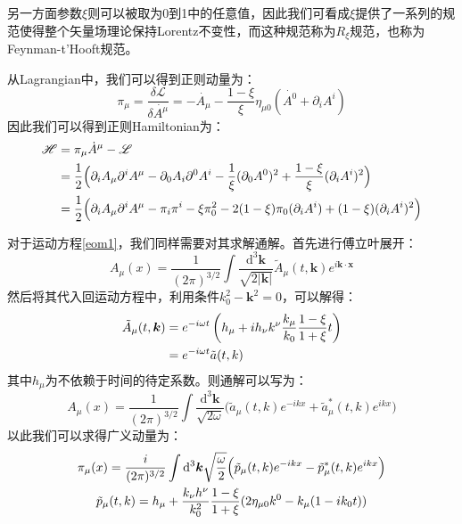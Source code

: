 另一方面参数$\xi$则可以被取为0到1中的任意值，因此我们可看成$\xi$提供了一系列的规范使得整个矢量场理论保持Lorentz不变性，而这种规范称为$R_\xi$规范，也称为Feynman-t'Hooft规范。

从Lagrangian中，我们可以得到正则动量为：
\begin{equation}
\pi_\mu=\frac{\delta\mathcal{L}}{\delta\dot{A^\mu}}=-\dot{A_\mu}-\frac{1-\xi}{\xi}\eta_{\mu 0}(\dot{A^0}+\partial_i A^i)
\end{equation}
因此我们可以得到正则Hamiltonian为：
\begin{align}
\mathscr{H}&=\pi_\mu \dot{A}^\mu-\mathscr{L}\notag\\
&=\frac{1}{2}\Big( \partial_iA_\mu\partial^iA^\mu-\partial_0{A_i}\partial^0{A^i}-\frac{1}{\xi}(\partial_0{A^0})^2+\frac{1-\xi}{\xi}(\partial_iA^i)^2\Big)\notag\\
&=\frac{1}{2}\Big(	\partial_iA_\mu\partial^iA^\mu-\pi_i\pi^i-{\xi}\pi_0^2-2(1-\xi)\pi_0(\partial_iA^i)+(1-{\xi})(\partial_i A^i)^2\Big)
\end{align}

对于运动方程\eqref{eom1}，我们同样需要对其求解通解。首先进行傅立叶展开：
\begin{equation}
A_\mu(x)=\frac{1}{(2\pi)^{3/2}}\int\frac{\mathrm{d}^3\boldsymbol{k}}{\sqrt{2|\boldsymbol{k}|}}\tilde{A}_\mu(t,\boldsymbol{k})e^{i\boldsymbol{k}\cdot\boldsymbol{x}}
\end{equation}
然后将其代入回运动方程中，利用条件$k_0^2-\boldsymbol{k}^2=0$，可以解得：
\begin{align}
\tilde{A}_\mu(t,\boldsymbol{k})&=e^{-i\omega t}\left( h_\mu+ih_\nu k^\nu\frac{k_\mu}{k_0}\frac{1-\xi}{1+\xi}t\right)\notag\\
&=e^{-i\omega t}\tilde{a}(t,k)
\end{align}
其中$h_\mu$为不依赖于时间的待定系数。则通解可以写为：
\begin{equation}
A_\mu(x)=\frac{1}{(2\pi)^{3/2}}\int\frac{\mathrm{d}^3\boldsymbol{k}}{\sqrt{2\omega}}\Big(\tilde{a}_\mu(t,k)e^{-ikx}+\tilde{a}^*_\mu(t,k)e^{ikx}\Big)
\end{equation}
以此我们可以求得广义动量为：
\begin{gather}
\pi_\mu(x)=\frac{i}{(2\pi)^{3/2}}\int\mathrm{d}^3\boldsymbol{k}\sqrt{\frac{\omega}{2}}\Big(\tilde{p}_\mu(t,k)e^{-ikx}-\tilde{p}^*_\mu(t,k)e^{ikx}\Big)\notag\\
\tilde{p}_\mu(t,k)=h_\mu+\frac{k_\nu h^\nu}{k_0^2}\frac{1-\xi}{1+\xi}(2\eta_{\mu 0}k^0-k_\mu(1-ik_0 t))
\end{gather}

